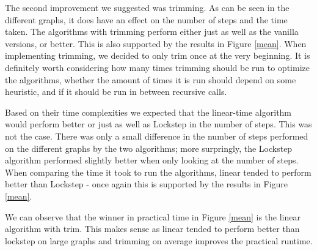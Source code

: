 \documentclass[../master/master.tex]{subfiles}
\begin{document}
The second improvement we suggested was trimming. As can be seen in the different graphs, it does have an effect on the number of steps and the time taken. The algorithms with trimming perform either just as well as the vanilla versions, or better. This is also supported by the results in Figure \ref{mean}. When implementing trimming, we decided to only trim once at the very beginning. It is definitely worth considering how many times trimming should be run to optimize the algorithms, whether the amount of times it is run should depend on some heuristic, and if it should be run in between recursive calls.

Based on their time complexities we expected that the linear-time algorithm would perform better or just as well as Lockstep in the number of steps. This was not the case. There was only a small difference in the number of steps performed on the different graphs by the two algorithms; more surpringly, the Lockstep algorithm performed slightly better when only looking at the number of steps. When comparing the time it took to run the algorithms, linear tended to perform better than Lockstep - once again this is supported by the results in Figure \ref{mean}.

We can observe that the winner in practical time in Figure \ref{mean} is the linear algorithm with trim. This makes sense as linear tended to perform better than lockstep on large graphs and trimming on average improves the practical runtime.
\end{document}
